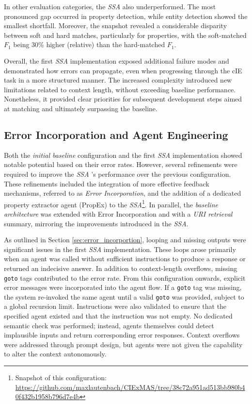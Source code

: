 \documentclass[a4paper,oneside,bibliography=totoc]{scrbook}
\begin{document}
In other evaluation categories, the \textit{\ac{SSA}} also underperformed. The most pronounced gap occurred in property detection, while entity detection showed the smallest shortfall. Moreover, the snapshot revealed a considerable disparity between soft and hard matches, particularly for properties, with the soft-matched $F_{1}$ being \(30\%\) higher (relative) than the hard-matched $F_{1}$.

Overall, the first \textit{\ac{SSA}} implementation exposed additional failure modes and demonstrated how errors can propagate, even when progressing through the \ac{cIE} task in a more structured manner. The increased complexity introduced new limitations related to context length, without exceeding baseline performance. Nonetheless, it provided clear priorities for subsequent development steps aimed at matching and ultimately surpassing the baseline.

\subsection{Error Incorporation and Agent Engineering}
\label{subsec:error_message_incorporation}

Both the \textit{initial baseline} configuration and the first \textit{\ac{SSA}} implementation showed notable potential based on their error rates. However, several refinements were required to improve the \textit{\ac{SSA}} 's performance over the previous configuration. These refinements included the integration of more effective feedback mechanisms, referred to as \textit{Error Incorporation}, and the addition of a dedicated property extractor agent (\ac{PropEx}) to the \textit{\ac{SSA}}\footnote{Snapshot of this configuration: \url{https://github.com/maxlautenbach/CIExMAS/tree/38c72a951ad513bb980b40f432b1958b796d7e4b}}. In parallel, the \textit{baseline architecture} was extended with Error Incorporation and with a \textit{\ac{URI} retrieval} summary, mirroring the improvements introduced in the \textit{\ac{SSA}}.

As outlined in Section \ref{sec:error_incorportion}, looping and missing outputs were significant issues in the first \textit{\ac{SSA}} implementation. These loops arose primarily when an agent was called without sufficient instructions to produce a response or returned an indecisive answer. In addition to context-length overflows, missing \texttt{goto} tags contributed to the error rate. From this configuration onwards, explicit error messages were incorporated into the agent flow. If a \texttt{goto} tag was missing, the system re-invoked the same agent until a valid \texttt{goto} was provided, subject to a global recursion limit. Instructions were also validated to ensure that the specified agent existed and that the instruction was not empty. No dedicated semantic check was performed; instead, agents themselves could detect implausible inputs and return corresponding error responses. Context overflows were addressed through prompt design, but agents were not given the capability to alter the context autonomously.
\end{document}
